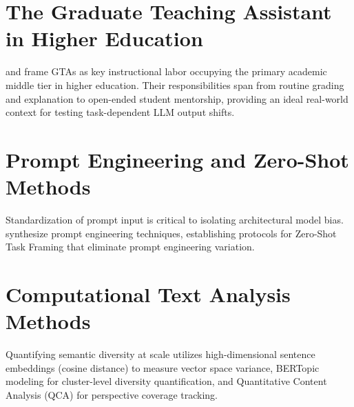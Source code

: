 \section{The Graduate Teaching Assistant in Higher Education}
\cite{Bousquet2008} and \cite{Muzaka2009} frame GTAs as key instructional labor occupying the primary academic middle tier in higher education. Their responsibilities span from routine grading and explanation to open-ended student mentorship, providing an ideal real-world context for testing task-dependent LLM output shifts.

\section{Prompt Engineering and Zero-Shot Methods}
Standardization of prompt input is critical to isolating architectural model bias. \cite{Sahoo2024} synthesize prompt engineering techniques, establishing protocols for Zero-Shot Task Framing that eliminate prompt engineering variation.

\section{Computational Text Analysis Methods}
Quantifying semantic diversity at scale utilizes high-dimensional sentence embeddings (cosine distance) to measure vector space variance, BERTopic modeling for cluster-level diversity quantification, and Quantitative Content Analysis (QCA) for perspective coverage tracking.

